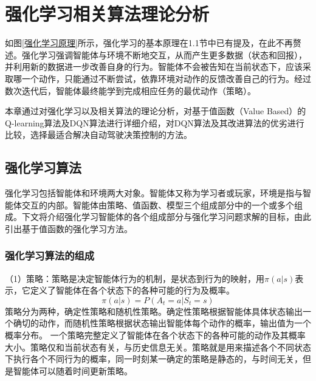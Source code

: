 %
%
%
%
%

\chapter{强化学习相关算法理论分析} %

如图\ref{强化学习原理}所示，强化学习的基本原理在1.1节中已有提及，在此不再赘述。强化学习强调智能体与环境不断地交互，从而产生更多数据（状态和回报），并利用新的数据进一步改善自身的行为。智能体不会被告知在当前状态下，应该采取哪一个动作，只能通过不断尝试，依靠环境对动作的反馈改善自己的行为。经过数次迭代后，智能体最终能学到完成相应任务的最优动作（策略）。

本章通过对强化学习以及相关算法的理论分析，对基于值函数（Value Based）的Q-learning算法及DQN算法进行详细介绍，对DQN算法及其改进算法的优劣进行比较，选择最适合解决自动驾驶决策控制的方法。

\section{强化学习算法} %

强化学习包括智能体和环境两大对象。智能体又称为学习者或玩家，环境是指与智能体交互的内部。智能体由策略、值函数、模型三个组成部分中的一个或多个组成。下文将介绍强化学习智能体的各个组成部分与强化学习问题求解的目标，由此引出基于值函数的强化学习方法。

\subsection{强化学习算法的组成} %

（1）策略：策略是决定智能体行为的机制，是状态到行为的映射，用$\pi(a|s)$表示，它定义了智能体在各个状态下的各种可能的行为及概率。
\begin{equation}\label{pi}
    \pi(a|s) = P(A_t = a | S_t = s)
\end{equation}
策略分为两种，确定性策略和随机性策略。确定性策略根据智能体具体状态输出一个确切的动作，而随机性策略根据状态输出智能体每个动作的概率，输出值为一个概率分布。
一个策略完整定义了智能体在各个状态下的各种可能的动作及其概率大小。策略仅和当前状态有关，与历史信息无关。策略就是用来描述各个不同状态下执行各个不同行为的概率，同一时刻某一确定的策略是静态的，与时间无关，但是智能体可以随着时间更新策略。

